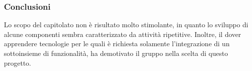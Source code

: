 \subsubsection{Conclusioni}
Lo scopo del capitolato non è risultato molto stimolante, in quanto lo
sviluppo di alcune componenti sembra caratterizzato da attività ripetitive.
Inoltre, il dover apprendere tecnologie per le quali è richiesta solamente 
l'integrazione di un sottoinsieme di funzionalità, ha demotivato il gruppo nella scelta di questo progetto.
